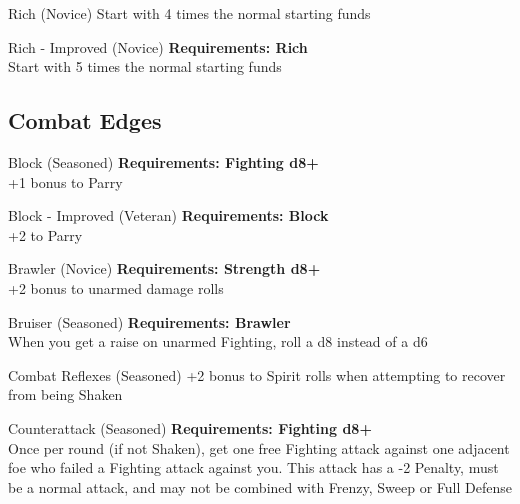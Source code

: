 \begin{multicols}{2}
\begin{genericsection}{Rich (Novice)}
Start with 4 times the normal starting funds
\end{genericsection}

\begin{genericsection}{Rich - Improved (Novice)}
\textbf{Requirements: Rich}\\
Start with 5 times the normal starting funds
\end{genericsection}

%
%
\subsection{Combat Edges}

\begin{genericsection}{Block (Seasoned)}
\textbf{Requirements: Fighting d8+}\\
+1 bonus to Parry
\end{genericsection}

\begin{genericsection}{Block - Improved (Veteran)}
\textbf{Requirements: Block}\\
+2 to Parry
\end{genericsection}

\begin{genericsection}{Brawler (Novice)}
\textbf{Requirements: Strength d8+}\\
+2 bonus to unarmed damage rolls
\end{genericsection}

\begin{genericsection}{Bruiser (Seasoned)}
\textbf{Requirements: Brawler}\\
When you get a raise on unarmed Fighting, roll a d8 instead of a d6
\end{genericsection}

\begin{genericsection}{Combat Reflexes (Seasoned)}
+2 bonus to Spirit rolls when attempting to recover from being Shaken
\end{genericsection}

\begin{genericsection}{Counterattack (Seasoned)}
\textbf{Requirements: Fighting d8+}\\
Once per round (if not Shaken), get one free Fighting attack against one adjacent foe who failed a Fighting attack against you. This attack has a -2 Penalty, must be a normal attack, and may not be combined with Frenzy, Sweep or Full Defense
\end{genericsection}


\end{multicols}
